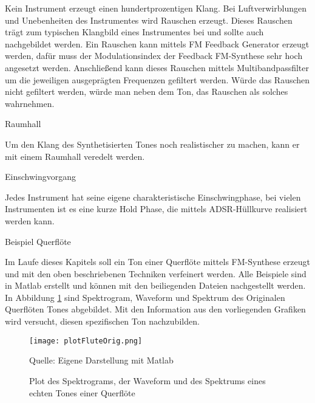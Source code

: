 Kein Instrument erzeugt einen hundertprozentigen Klang. Bei Luftverwirblungen und Unebenheiten des Instrumentes wird Rauschen erzeugt. Dieses Rauschen trägt zum typischen Klangbild eines Instrumentes bei und sollte auch nachgebildet werden. Ein Rauschen kann mittels FM Feedback Generator erzeugt werden, dafür muss der Modulationsindex der Feedback FM-Synthese sehr hoch angesetzt werden. Anschließend kann dieses Rauschen mittels Multibandpassfilter um die jeweiligen ausgeprägten Frequenzen gefiltert werden. Würde das Rauschen nicht gefiltert werden, würde man neben dem Ton, das Rauschen als solches wahrnehmen.


Raumhall

Um den Klang des Synthetisierten Tones noch realistischer zu machen, kann er mit einem Raumhall veredelt werden.

Einschwingvorgang

Jedes Instrument hat seine eigene charakteristische Einschwingphase, bei vielen Instrumenten ist es eine kurze Hold Phase, die mittels ADSR-Hüllkurve realisiert werden kann.


Beispiel Querflöte

Im Laufe dieses Kapitels soll ein Ton einer Querflöte mittels FM-Synthese erzeugt und mit den oben beschriebenen Techniken verfeinert werden. Alle Beispiele sind in Matlab erstellt und können mit den beiliegenden Dateien nachgestellt werden. In Abbildung \ref{fig:plotFluteOrig} sind Spektrogram, Waveform und Spektrum des Originalen Querflöten Tones abgebildet. Mit den Information aus den vorliegenden Grafiken wird versucht, diesen spezifischen Ton nachzubilden.

\begin{figure} [ht]
\centering
  \texttt{[image: plotFluteOrig.png]}
\caption{Plot des Spektrograms, der Waveform und des Spektrums eines echten Tones einer Querflöte}
\label{fig:plotFluteOrig}
Quelle: Eigene Darstellung mit Matlab
\end{figure}


